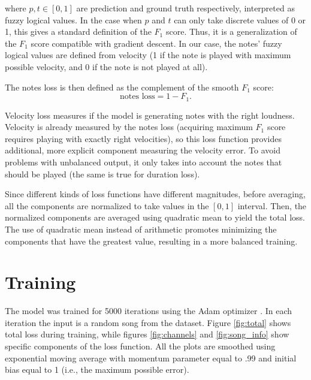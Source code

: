 \documentclass[en]{pracamgr}
\begin{document}
where $p,t\in[0,1]$ are prediction and ground truth respectively, interpreted as fuzzy logical values.
In the case when $p$ and $t$ can only take discrete values of 0 or 1, this gives a standard definition of the $F_1$ score.
Thus, it is a generalization of the $F_1$ score compatible with gradient descent.
In our case, the notes' fuzzy logical values are defined from velocity (1 if the note is played with maximum possible velocity, and 0 if the note is not played at all).

The notes loss is then defined as the complement of the smooth $F_1$ score:
\begin{equation}
    \textrm{notes loss} = 1 - F_1.
\end{equation}

Velocity loss measures if the model is generating notes with the right loudness.
Velocity is already measured by the notes loss (acquiring maximum $F_1$ score requires playing with exactly right velocities), so this loss function provides additional, more explicit component measuring the velocity error.
To avoid problems with unbalanced output, it only takes into account the notes that should be played (the same is true for duration loss).

Since different kinds of loss functions have different magnitudes, before averaging, all the components are normalized to take values in the $[0,1]$ interval.
Then, the normalized components are averaged using quadratic mean to yield the total loss. The use of quadratic mean instead of arithmetic promotes minimizing the components that have the greatest value, resulting in a more balanced training.

\section{Training}

The model was trained for 5000 iterations using the Adam optimizer \cite{adam}.
In each iteration the input is a random song from the dataset.
Figure \ref{fig:total} shows total loss during training, while figures \ref{fig:channels} and \ref{fig:song_info} show specific components of the loss function.
All the plots are smoothed using exponential moving average with momentum parameter equal to .99 and initial bias equal to 1 (i.e., the maximum possible error).
\end{document}
